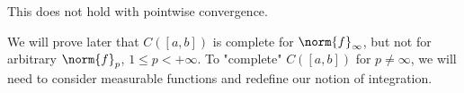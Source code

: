 \begin{remark}
    This does not hold with pointwise convergence.
\end{remark}

\begin{remark}
    We will prove later that $C([a,b])$ is complete for $\norm{f}_\infty$, but not for arbitrary $\norm{f}_p$, $1 \leq p < +\infty$. To "complete" $C([a, b])$ for $p \neq \infty$, we will need to consider measurable functions and redefine our notion of integration.
\end{remark}

